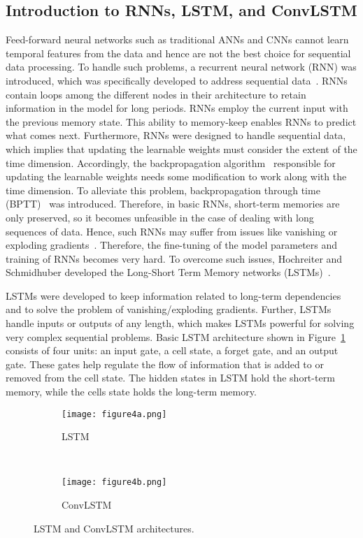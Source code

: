 \subsection{Introduction to RNNs, LSTM, and ConvLSTM}
Feed-forward neural networks such as traditional ANNs and CNNs cannot learn temporal features from the data and hence are not the best choice for sequential data processing.
To handle such problems, a recurrent neural network (RNN) was introduced, which was specifically developed to address sequential data~\cite{aggarwal2018neural, Lecun2015, goodfellow2016deep}. 
RNNs contain loops among the different nodes in their architecture to retain information in the model for long periods.
RNNs employ the current input with the previous memory state.
This ability to memory-keep enables RNNs to predict what comes next. 
Furthermore, RNNs were designed to handle sequential data, which implies that updating the learnable weights must consider the extent of the time dimension. 
Accordingly, the backpropagation algorithm~\cite{Rumelhart1986} responsible for updating the learnable weights needs some modification to work along with the time dimension.
To alleviate this problem, backpropagation through time (BPTT)~\cite{aggarwal2018neural, goodfellow2016deep} was introduced. 
Therefore, in basic RNNs, short-term memories are only preserved, so it becomes unfeasible in the case of dealing with long sequences of data. Hence, such RNNs may suffer from issues like vanishing or exploding gradients~\cite{bengio1994learning}.
Therefore, the fine-tuning of the model parameters and training of RNNs becomes very hard.
To overcome such issues, Hochreiter and Schmidhuber developed the Long-Short 
Term Memory networks (LSTMs)~\cite{Hochreiter1997}.

LSTMs were developed to keep information related to long-term dependencies and 
to solve the problem of vanishing/exploding gradients.
Further, LSTMs handle inputs or outputs of any length, which makes LSTMs 
powerful for solving very complex sequential problems. 
Basic LSTM architecture shown in Figure~\ref{fig:LSTM} consists of four units: 
an input gate, a cell state, a forget gate, and an output gate.
These gates help regulate the flow of information that is added to or removed 
from the cell state. 
The hidden states in LSTM hold the short-term memory, while the cells state 
holds the long-term memory.
\begin{figure} [!h]
	\centering
	\begin{subfigure}[b]{0.5\textwidth}
		\centering
		\texttt{[image: figure4a.png]}
		\caption{\centering LSTM}
		\label{fig:LSTM}
	\end{subfigure}
	\\ 
	\hfill
	\begin{subfigure}[b]{0.5\textwidth}
		\centering
		\texttt{[image: figure4b.png]}
		\caption{\centering ConvLSTM}
		\label{fig:ConvLSTM}	
	\end{subfigure}
	\caption{LSTM and ConvLSTM architectures.}
	\label{fig:lstm_convlstm}
\end{figure}

